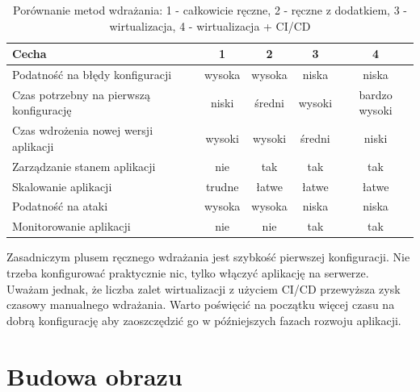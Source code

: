 \documentclass{article}
\begin{document}
\begin{table}[H]
\centering
\begin{tabular}{|l|c|c|c|c|}
\hline
\textbf{Cecha} & \textbf{1} & \textbf{2} & \textbf{3} & \textbf{4} \\ \hline
Podatność na błędy konfiguracji         & \cellcolor{red!50}wysoka & \cellcolor{red!50}wysoka & \cellcolor{green!50}niska & \cellcolor{green!50}niska \\ \hline
Czas potrzebny na pierwszą konfigurację & \cellcolor{green!50}niski & \cellcolor{yellow!50}średni & \cellcolor{red!50}wysoki & \cellcolor{red!50}bardzo wysoki \\ \hline
Czas wdrożenia nowej wersji aplikacji   & \cellcolor{red!50}wysoki & \cellcolor{red!50}wysoki & \cellcolor{yellow!50}średni & \cellcolor{green!50}niski \\ \hline
Zarządzanie stanem aplikacji            & \cellcolor{red!50}nie & \cellcolor{green!50}tak & \cellcolor{green!50}tak & \cellcolor{green!50}tak \\ \hline
Skalowanie aplikacji                    & \cellcolor{red!50}trudne & \cellcolor{green!50}łatwe & \cellcolor{green!50}łatwe & \cellcolor{green!50}łatwe \\ \hline
Podatność na ataki                      & \cellcolor{red!50}wysoka & \cellcolor{red!50}wysoka & \cellcolor{green!50}niska & \cellcolor{green!50}niska \\ \hline
Monitorowanie aplikacji                 & \cellcolor{red!50}nie & \cellcolor{red!50}nie & \cellcolor{green!50}tak & \cellcolor{green!50}tak \\ \hline
\end{tabular}
\caption{Porównanie metod wdrażania: 1 - całkowicie ręczne, 2 - ręczne z dodatkiem, 3 - wirtualizacja, 4 - wirtualizacja + CI/CD}
\label{tab:porownanie-metod-wdrazania}
\end{table}

Zasadniczym plusem ręcznego wdrażania jest szybkość pierwszej konfiguracji. Nie trzeba konfigurować praktycznie nic, tylko włączyć aplikację na serwerze. Uważam jednak, że liczba zalet wirtualizacji z użyciem CI/CD przewyższa zysk czasowy manualnego wdrażania. Warto poświęcić na początku więcej czasu na dobrą konfigurację aby zaoszczędzić go w późniejszych fazach rozwoju aplikacji.


\section{Budowa obrazu} \label{sectionBudowaObrazu}
\end{document}
